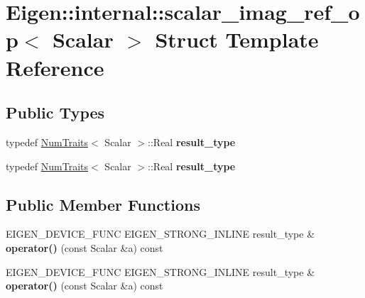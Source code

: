 \hypertarget{struct_eigen_1_1internal_1_1scalar__imag__ref__op}{}\section{Eigen\+:\+:internal\+:\+:scalar\+\_\+imag\+\_\+ref\+\_\+op$<$ Scalar $>$ Struct Template Reference}
\label{struct_eigen_1_1internal_1_1scalar__imag__ref__op}
\subsection*{Public Types}
\begin{DoxyCompactItemize}
\item 
\mbox{\label{struct_eigen_1_1internal_1_1scalar__imag__ref__op_a0b0205a8cc554c1be5ed7599e9922e7b}} 
typedef \hyperlink{group___core___module_struct_eigen_1_1_num_traits}{Num\+Traits}$<$ Scalar $>$\+::Real {\bfseries result\+\_\+type}
\item 
\mbox{\label{struct_eigen_1_1internal_1_1scalar__imag__ref__op_a0b0205a8cc554c1be5ed7599e9922e7b}} 
typedef \hyperlink{group___core___module_struct_eigen_1_1_num_traits}{Num\+Traits}$<$ Scalar $>$\+::Real {\bfseries result\+\_\+type}
\end{DoxyCompactItemize}
\subsection*{Public Member Functions}
\begin{DoxyCompactItemize}
\item 
\mbox{\label{struct_eigen_1_1internal_1_1scalar__imag__ref__op_ad4b4a42cb29dd73505f747dab138ee45}} 
E\+I\+G\+E\+N\+\_\+\+D\+E\+V\+I\+C\+E\+\_\+\+F\+U\+NC E\+I\+G\+E\+N\+\_\+\+S\+T\+R\+O\+N\+G\+\_\+\+I\+N\+L\+I\+NE result\+\_\+type \& {\bfseries operator()} (const Scalar \&a) const
\item 
\mbox{\label{struct_eigen_1_1internal_1_1scalar__imag__ref__op_ad4b4a42cb29dd73505f747dab138ee45}} 
E\+I\+G\+E\+N\+\_\+\+D\+E\+V\+I\+C\+E\+\_\+\+F\+U\+NC E\+I\+G\+E\+N\+\_\+\+S\+T\+R\+O\+N\+G\+\_\+\+I\+N\+L\+I\+NE result\+\_\+type \& {\bfseries operator()} (const Scalar \&a) const
\end{DoxyCompactItemize}


